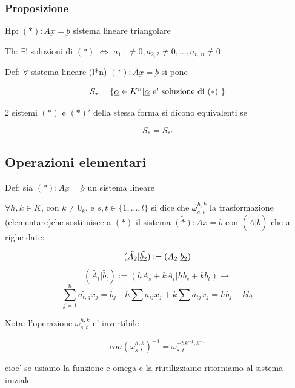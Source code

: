 \documentclass{article}
\begin{document}
\subsubsection{Proposizione}
\begin{flushleft}
  Hp: $(*):A\underbar{x}=\underbar{b}$ sistema lineare triangolare
\end{flushleft}
\begin{flushleft}
  Th: $\exists !$ soluzioni di $(*)$ $\iff$ $a_{1,1} \neq 0, a_{2,2} \neq 0,...,a_{n,n} \neq 0$
\end{flushleft}
\begin{flushleft}
  Def: $\forall$ sistema lineare (l*n) $(*):A \underbar{x}=\underbar{b}$ si pone
\end{flushleft}
\begin{equation*}
  S_*=\{\underbar{$\alpha$} \in K^n | \underbar{$\alpha$} \text{ e' soluzione di $(*)$ } \}
\end{equation*}
\begin{flushleft}
  2 sistemi $(*)$ e $(*)'$ della stessa forma si dicono equivalenti se
\end{flushleft}
\begin{equation*}
  S_*=S_{*'}
\end{equation*}
\subsection{Operazioni elementari}
\begin{flushleft}
  Def: sia $(*):A\underbar{x}=\underbar{b}$ un sistema lineare
\end{flushleft}
\begin{flushleft}
  $\forall h,k\in K$, con $k \neq 0_k$, e $s,t \in \{1,...,l \}$ si dice che $\omega^{h,k}_{s,t}$ 
  la trasformazione (elementare)che sostituisce a $(*)$ il sistema $\tilde{(*)}:\tilde{A} \underbar{x}=\tilde{\underbar{b}}$
  con $(\tilde{A}|\tilde{\underbar{b}})$ che a righe date:
\end{flushleft}
\begin{equation*}
   (\tilde{A_2}|\tilde{\underbar{$b_2$}}):=(A_2|\underbar{$b_2$})
\end{equation*}
\begin{equation*}
  (\tilde{A_t}|\tilde{b_t}):=(hA_s+kA_t|hb_s+kb_t)\to
\end{equation*}
\begin{equation*}
  \sum^n_{j=1} \tilde{a_{t,g}}x_j=\tilde{b_j} \quad h\sum a_{ij}x_j+k\sum a_{tj}x_j=hb_j+kb_t
\end{equation*}
\begin{flushleft}
  Nota: l'operazione $\omega^{h,k}_{s,t}$ e' invertibile
\end{flushleft}
\begin{equation*}
  con(\omega^{h,k}_{s,t})^{-1}=\omega^{-hk^{-1},k^{-1}}_{s,t}
\end{equation*}
\begin{flushleft}
  cioe' se usiamo la funzione e omega e la riutilizziamo ritorniamo al sistema iniziale
\end{flushleft}
\end{document}

